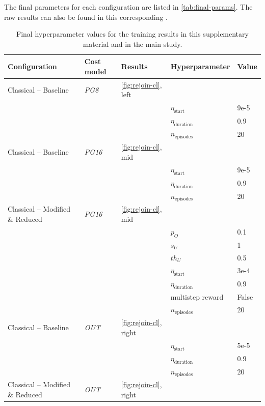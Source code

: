 \documentclass[10pt, conference]{IEEEtran}
\begin{document}
The final parameters for each configuration are listed in \autoref{tab:final-params}. The raw results can also be found in this corresponding \repro.
\begin{table}
  \caption{Final hyperparameter values for the training results in this supplementary material and in the main study.}
  \label{tab:final-params}


  \begin{tabularx}{\textwidth}{llllX}
    \toprule
    \rowcolor{white} \textbf{Configuration} & \textbf{Cost model} & \textbf{Results} & \textbf{Hyperparameter} & \textbf{Value} \\
    \midrule
    Classical -- Baseline & \emph{PG8} & \autoref{fig:rejoin-cl}, left & & \\
    & & & $\eta_\text{start}$ & 9e-5 \\
    & & & $\eta_\text{duration}$ & 0.9 \\
    & & & $n_\text{episodes}$ & 20 \\
    \midrule
    Classical -- Baseline & \emph{PG16} & \autoref{fig:rejoin-cl}, mid & & \\
    & & & $\eta_\text{start}$ & 9e-5 \\
    & & & $\eta_\text{duration}$ & 0.9 \\
    & & & $n_\text{episodes}$ & 20 \\
    \midrule
    Classical -- Modified \& Reduced & \emph{PG16} & \autoref{fig:rejoin-cl}, mid & & \\
    & & & $p_O$ & 0.1 \\
    & & & $s_U$ & 1 \\
    & & & $th_U$ & 0.5 \\
    & & & $\eta_\text{start}$ & 3e-4 \\
    & & & $\eta_\text{duration}$ & 0.9 \\
    & & & multistep reward & False \\
    & & & $n_\text{episodes}$ & 20 \\
    \midrule
    Classical -- Baseline & \emph{OUT} & \autoref{fig:rejoin-cl}, right & & \\
    & & & $\eta_\text{start}$ & 5e-5 \\
    & & & $\eta_\text{duration}$ & 0.9 \\
    & & & $n_\text{episodes}$ & 20 \\
    \midrule
    Classical -- Modified \& Reduced & \emph{OUT} & \autoref{fig:rejoin-cl}, right & & \\

\end{tabularx}
\end{table}
\end{document}
